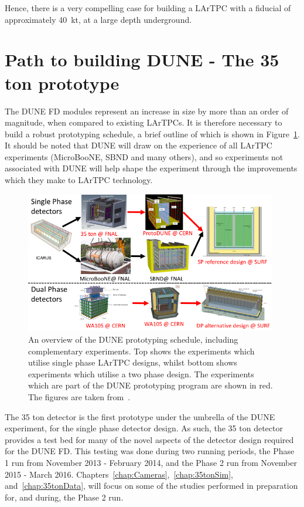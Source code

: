 Hence, there is a very compelling case for building a LArTPC with a fiducial of approximately 40~kt, at a large depth underground. \\

\section{Path to building DUNE - The 35 ton prototype} \label{sec:The35tonDetector}  %
The DUNE FD modules represent an increase in size by more than an order of magnitude, when compared to existing LArTPCs. It is therefore necessary to build a robust prototyping schedule, a brief outline of which is shown in Figure~\ref{fig:DUNEProtSched}. It should be noted that DUNE will draw on the experience of all LArTPC experiments (MicroBooNE, SBND and many others), and so experiments not associated with DUNE will help shape the experiment through the improvements which they make to LArTPC technology. \\ 

\begin{figure}
  \centering
  \includegraphics[width=0.98\textwidth]{PrototypeSched}
  \caption[An overview of the DUNE prototyping schedule, including complementary experiments]
          {An overview of the DUNE prototyping schedule, including complementary experiments. Top shows the experiments which utilise single phase LArTPC designs, whilst bottom shows experiments which utilise a two phase design. The experiments which are part of the DUNE prototyping program are shown in red. The figures are taken from~\citep{DUNECDR_V4, MarkReviewJuly2015}.}
  \label{fig:DUNEProtSched}
\end{figure}

The 35 ton detector is the first prototype under the umbrella of the DUNE experiment, for the single phase detector design. As such, the 35 ton detector provides a test bed for many of the novel aspects of the detector design required for the DUNE FD. This testing was done during two running periods, the Phase 1 run from November 2013 - February 2014, and the Phase 2 run from November 2015 - March 2016. Chapters~\ref{chap:Cameras},~\ref{chap:35tonSim}, and~\ref{chap:35tonData}, will focus on some of the studies performed in preparation for, and during, the Phase 2 run. \\ 

